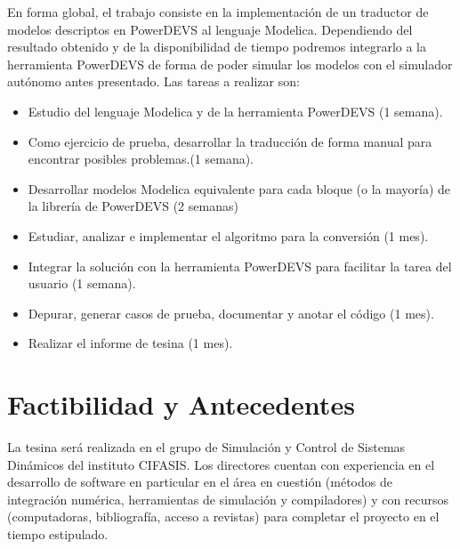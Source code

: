 \documentclass[a4paper,	11pt]{article}
\begin{document}
En forma global, el trabajo consiste en la implementación de un traductor de modelos descriptos en PowerDEVS al lenguaje
Modelica. Dependiendo del resultado obtenido y de la disponibilidad de tiempo podremos integrarlo a la herramienta PowerDEVS
de forma de poder simular los modelos con el simulador autónomo antes presentado.
% 
Las tareas a realizar son: 
\begin{itemize}
	\item Estudio del lenguaje Modelica y de la herramienta PowerDEVS (1 semana). 
	\item Como ejercicio de prueba, desarrollar la traducción de forma manual para encontrar posibles problemas.(1 semana).
	\item Desarrollar modelos Modelica equivalente para cada bloque (o la mayoría) de la librería de PowerDEVS (2 semanas)
	\item Estudiar, analizar e implementar el algoritmo para la conversión (1 mes).
	\item Integrar la solución con la herramienta PowerDEVS para facilitar la tarea del usuario (1 semana).
	\item Depurar, generar casos de prueba, documentar y anotar el código (1 mes).
	\item Realizar el informe de tesina (1 mes).
\end{itemize}



\section{Factibilidad y Antecedentes}
La tesina será realizada en el grupo de Simulación y Control de Sistemas Dinámicos del instituto CIFASIS. Los directores cuentan 
con experiencia en el desarrollo de software en particular en el área en cuestión (métodos de integración numérica, 
herramientas de simulación y compiladores) y con recursos (computadoras, bibliografía, acceso a revistas) para completar el proyecto
en el tiempo estipulado.


\begin{small}

\end{small}
\end{document}
